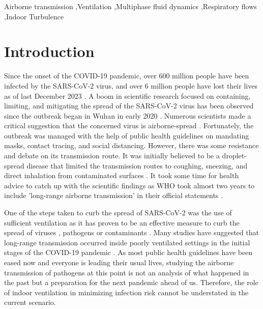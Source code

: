 \documentclass[a4paper,12pt]{elsarticle}
\begin{document}
\begin{frontmatter}
\begin{keyword}
Airborne transmission \sep Ventilation \sep Multiphase fluid dynamics \sep Respiratory flows \sep Indoor Turbulence

\end{keyword}

\end{frontmatter}


\section{Introduction}
\label{sec:sample1}

Since the onset of the COVID-19 pandemic, over 600 million people have been infected by the SARS-CoV-2 virus, and over 6 million people have lost their lives as of last December 2023 \cite{world2023therapeutics}. A boom in scientific research focused on containing, limiting, and mitigating the spread of the SARS-CoV-2 virus has been observed since the outbreak began in Wuhan in early 2020 \cite{morawska2020can,morawska2020time}. Numerous scientists made a critical suggestion that the concerned virus is airborne-spread \cite{zhang2020identifying,bazant2021guideline,morawska2020airborne}. Fortunately, the outbreak was managed with the help of public health guidelines on mandating masks, contact tracing, and social distancing. However, there was some resistance and debate on its transmission route. It was initially believed to be a droplet-spread disease that limited the transmission routes to coughing, sneezing, and direct inhalation from contaminated surfaces \citep{chagla2021re}. It took some time for health advice to catch up with the scientific findings as WHO took almost two years to include 'long-range airborne transmission' in their official statements \cite{lewis2022took}.

One of the steps taken to curb the spread of SARS-CoV-2 was the use of sufficient ventilation as it has proven to be an effective measure to curb the spread of viruses \cite{ren2021numerical}, pathogens \cite{berrouk2010experimental} or contaminants \cite{li2020investigating}. Many studies have suggested that long-range transmission occurred inside poorly ventilated settings in the initial stages of the COVID-19 pandemic \cite{morawska2020can,li2021probable, liu2021simulation}. As most public health guidelines have been eased now and everyone is leading their usual lives, studying the airborne transmission of pathogens at this point is not an analysis of what happened in the past but a preparation for the next pandemic ahead of us. Therefore, the role of indoor ventilation in minimizing infection risk cannot be understated in the current scenario.
\end{document}
